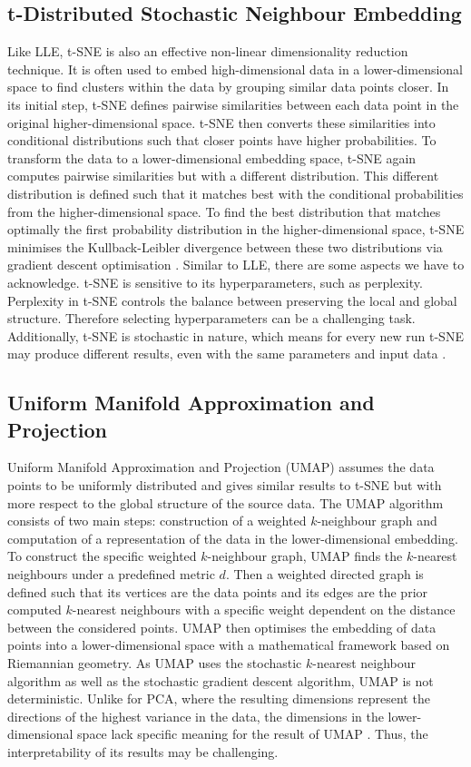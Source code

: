 \documentclass[pdftex,12pt,a4paper]{report}
\begin{document}
\subsection{t-Distributed Stochastic Neighbour Embedding}
Like LLE, t-SNE is also an effective non-linear dimensionality reduction technique.
It is often used to embed high-dimensional data in a lower-dimensional space to find clusters within the data by grouping similar data points closer.
In its initial step, t-SNE defines pairwise similarities between each data point in the original higher-dimensional space.
t-SNE then converts these similarities into conditional distributions such that closer points have higher probabilities.
To transform the data to a lower-dimensional embedding space, t-SNE again computes pairwise similarities but with a different distribution.
This different distribution is defined such that it matches best with the conditional probabilities from the higher-dimensional space.
To find the best distribution that matches optimally the first probability distribution in the higher-dimensional space, t-SNE minimises the Kullback-Leibler divergence between these two distributions via gradient descent optimisation \cite{t-SNE}.
Similar to LLE, there are some aspects we have to acknowledge.
t-SNE is sensitive to its hyperparameters, such as perplexity.
Perplexity in t-SNE controls the balance between preserving the local and global structure.
Therefore selecting hyperparameters can be a challenging task.
Additionally, t-SNE is stochastic in nature, which means for every new run t-SNE may produce different results, even with the same parameters and input data \cite{tsne-drawback}.

\subsection{Uniform Manifold Approximation and Projection }
Uniform Manifold Approximation and Projection (UMAP) assumes the data points to be uniformly distributed and gives similar results to t-SNE but with more respect to the global structure of the source data.
The UMAP algorithm consists of two main steps: construction of a weighted $k$-neighbour graph and computation of a representation of the data in the lower-dimensional embedding.
To construct the specific weighted $k$-neighbour graph, UMAP finds the $k$-nearest neighbours under a predefined metric $d$.
Then a weighted directed graph is defined such that its vertices are the data points and its edges are the prior computed $k$-nearest neighbours with a specific weight dependent on the distance between the considered points.
UMAP then optimises the embedding of data points into a lower-dimensional space with a mathematical framework based on Riemannian geometry.
As UMAP uses the stochastic $k$-nearest neighbour algorithm as well as the stochastic gradient descent algorithm, UMAP is not deterministic.
Unlike for PCA, where the resulting dimensions represent the directions of the highest variance in the data, the dimensions in the lower-dimensional space lack specific meaning for the result of UMAP \cite{umap-implementation}.
Thus, the interpretability of its results may be challenging.
\end{document}

